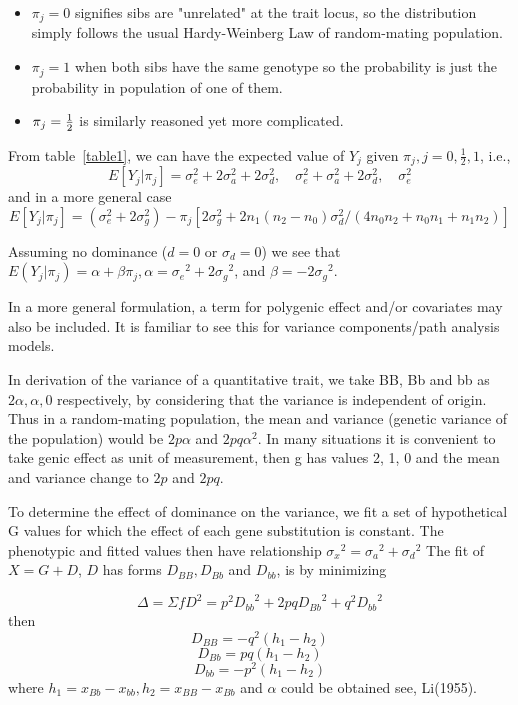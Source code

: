 \begin{itemize}
\item $\pi_j=0$ signifies
sibs are "unrelated" at the trait locus, so the distribution simply follows the
usual Hardy-Weinberg Law of random-mating population.
\item $\pi_j=1$ when both sibs have the same genotype so the probability is just
the probability in population of one of them.
\item $\pi_j={1\over2}$ is similarly reasoned yet more complicated. 
\end{itemize}

From table~\ref{table1}, we can have the expected value of $Y_j$ given $\pi_j,
j=0,\frac{1}{2}, 1$, i.e.,
$$E[Y_j|\pi_j]=\sigma_e^2+2\sigma_a^2+2\sigma_d^2,\quad 
\sigma_e^2+\sigma_a^2+2\sigma_d^2,\quad
\sigma_e^2$$
and in a more general case
$$E[Y_j|\pi_j]=(\sigma_e^2+2\sigma_g^2)-\pi_j[2\sigma_g^2+2n_1(n_2-n_0)\sigma_d^2/(4n_0n_2+n_0n_1+n_1n_2)]$$

Assuming no dominance ($d=0$ or $\sigma_d=0$) we see that
$E(Y_j|\pi_j)=\alpha+\beta\pi_j, \alpha={\sigma_e}^2+2{\sigma_g}^2$, and
$\beta=-2{\sigma_g}^2$. 

In a more general formulation, a term for polygenic effect and/or covariates
may also be included.  It is familiar to see this for variance components/path
analysis models.

In derivation of the variance of a quantitative trait, we take BB, Bb and bb as
$2\alpha, \alpha, 0$ respectively, by considering that the variance is
independent of origin.  Thus in a random-mating population, the mean and
variance (genetic variance of the population) would be $2p\alpha$ and
$2pq{\alpha}^2$.  In many situations it is convenient to take genic effect as
unit of measurement, then g has values 2, 1, 0 and the mean and variance change
to $2p$ and $2pq$.

To determine the effect of dominance on the variance, we fit a set of
hypothetical G values for which the effect of each gene substitution is constant.
The phenotypic and fitted values then have relationship
${\sigma_x}^2={\sigma_a}^2+{\sigma_d}^2$ The fit of $X=G+D$, $D$ has forms
$D_{BB}, D_{Bb}$ and $D_{bb}$, is by minimizing

  $$\Delta = \Sigma fD^2=p^2{D_{bb}}^2+2pq{D_{Bb}}^2+q^2{D_{bb}}^2$$
then
  $$D_{BB}=-q^2(h_1 -h_2)$$
  $$D_{Bb}=pq(h_1 - h_2) $$
  $$D_{bb}=-p^2(h_1 -h_2)$$
  where $h_1=x_{Bb}-x_{bb}, h_2=x_{BB}-x_{Bb}$ and $\alpha$ could be obtained
see, Li(1955).


